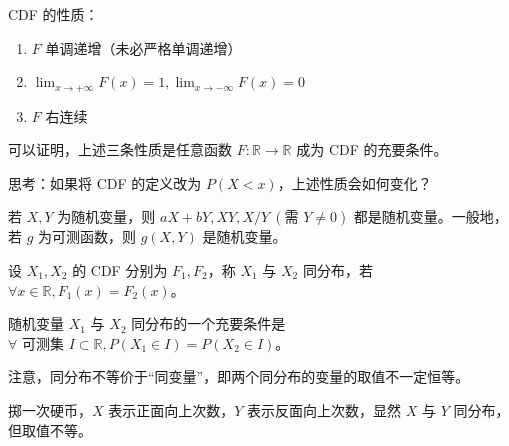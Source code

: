 \documentclass[../main.tex]{subfiles}
\begin{document}
\begin{proposition}
  CDF 的性质：
  \begin{enumerate}
    \item $F$ 单调递增（未必严格单调递增）
    \item $\lim_{x\rightarrow+\infty}F(x)=1,\lim_{x\rightarrow-\infty}F(x)=0$
    \item $F$ 右连续
  \end{enumerate}
\end{proposition}

可以证明，上述三条性质是任意函数 $F:\mathbb{R}\rightarrow\mathbb{R}$ 成为 CDF 的充要条件。

思考：如果将 CDF 的定义改为 $P(X<x)$，上述性质会如何变化？

\begin{proposition}
  若 $X,Y$ 为随机变量，则 $aX+bY,XY,X/Y\ (\text{需 }Y\neq 0)$ 都是随机变量。一般地，若 $g$ 为可测函数，则 $g(X,Y)$ 是随机变量。
\end{proposition}

\begin{definition}\label{def:2.1.4}
  设 $X_1,X_2$ 的 CDF 分别为 $F_1,F_2$，称 $X_1$ 与 $X_2$ 同分布，若 $\forall x\in\mathbb{R},F_1(x)=F_2(x)$。
\end{definition}

\begin{proposition}
  随机变量 $X_1$ 与 $X_2$ 同分布的一个充要条件是 $\forall \text{ 可测集 }I\subset\mathbb{R},P(X_1\in I)=P(X_2\in I)$。
\end{proposition}

注意，同分布不等价于“同变量”，即两个同分布的变量的取值不一定恒等。

\begin{example}
  掷一次硬币，$X$ 表示正面向上次数，$Y$ 表示反面向上次数，显然 $X$ 与 $Y$ 同分布，但取值不等。
\end{example}
\end{document}
